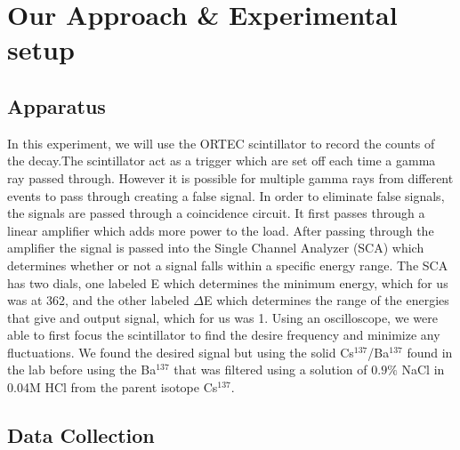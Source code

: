 \documentclass[11pt,letterpaper,onecolumn]{article}
\begin{document}

\section{Our Approach \& Experimental setup}

\subsection{Apparatus}






In this experiment, we will use the ORTEC scintillator to record the counts of the decay.The scintillator act as a trigger which are set off each time a gamma ray passed through. However it is possible for multiple gamma rays from different events to pass through creating a false signal. In order to eliminate false signals, the signals are passed through a coincidence circuit. It first passes through a linear amplifier which adds more power to the load. After passing through the amplifier the signal is passed into the Single Channel Analyzer (SCA) which determines whether or not a signal falls within a specific energy range. The SCA has two dials, one labeled E which determines the minimum energy, which for us was at 362, and the other labeled $\Delta$E which determines the range of the energies that give and output signal, which for us was 1. Using an oscilloscope, we were able to first focus the scintillator to find the desire frequency and minimize any fluctuations. We found the desired signal but using the solid Cs$^137$/Ba$^137$ found in the lab before using the Ba$^137$ that was filtered using a solution of $0.9\%$ NaCl in 0.04M HCl from the parent isotope Cs$^137$. ~\cite{HL,GGC}

\subsection{Data Collection}
\end{document}
